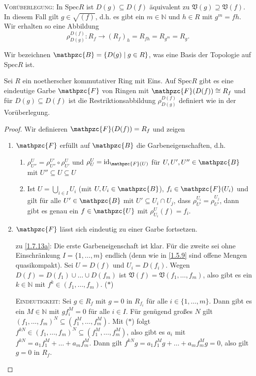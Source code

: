 \documentclass[a4paper,12pt]{scrbook}
\newtheorem{proof}{Beweis}
\def\V{\mathfrak{V}}
\newcommand{\Spec}{\mathrm{Spec}}
\newcommand{\id}{\mathrm{id}}
\newcommand{\ra}{\longrightarrow}
\newcommand{\set}[1]{\ensuremath{\mathbb{#1}}}
\newcommand{\N}{\set{N}}
\begin{document}
\textsc{Vorüberlegung}: In $\Spec R$ ist $D(g)\subseteq D(f)$ äquivalent zu $\V(g)\supseteq\V(f)$. In diesem Fall gilt
$g\in\sqrt{(f)}$, d.h. es gibt ein $m\in\N$ und $h\in R$ mit $g^m=fh$. Wir erhalten so eine Abbildung
\[ \rho_{D(g)}^{D(f)}\colon R_f\ra (R_f)_h=R_{fh}=R_{g^m}=R_g. \]

Wir bezeichnen $\mathpzc{B}=\{D(g)\mid g\in R\}$, was eine Basis der Topologie auf $\Spec R$ ist.

\begin{prop}\label{1.7.13}
  Sei $R$ ein noetherscher kommutativer Ring mit Eins.
  Auf $\Spec R$ gibt es eine eindeutige Garbe $\mathpzc{F}$ von Ringen mit $\mathpzc{F}(D(f))\cong R_f$ und für $D(g)\subseteq
  D(f)$ ist die Restriktionsabbildung $\rho_{D(g)}^{D(f)}$ definiert wie in der Vorüberlegung.
\end{prop}
\begin{proof}
  Wir definieren $\mathpzc{F}(D(f))=R_f$ und zeigen
  \begin{enumerate}
  \item{} $\mathpzc{F}$ erfüllt auf $\mathpzc{B}$ die Garbeneigenschaften, d.h.
    \begin{enumerate}[label=(\textsc{g}\arabic*)]
    \item\label{G1} $\rho_{U''}^U=\rho_{U''}^{U'}\circ\rho_{U'}^U$ und $\rho_U^U=\id_{\mathpzc{F}(U)}$ für
      $U,U',U''\in\mathpzc{B}$ mit $U''\subseteq U\subseteq U$
    \item\label{G2} Ist $U=\bigcup_{i\in I}U_i$ (mit $U,U_i\in\mathpzc{B}$), $f_i\in\mathpzc{F}(U_i)$ und gilt für alle
      $U'\in\mathpzc{B}$ mit $U'\subseteq U_i\cap U_j$, dass $\rho_{U'}^{U_i}=\rho_{U'}^{U_j}$, dann gibt es genau ein
      $f\in\mathpzc{U}$ mit $\rho_{U_i}^U(f)=f_i$.
    \end{enumerate}
  \item{} $\mathpzc{F}$ lässt sich eindeutig zu einer Garbe fortsetzen.
  \end{enumerate}
  \begin{enumerate}
  \item[zu] \ref{1.7.13a}: Die erste Garbeneigenschaft ist klar. Für die zweite sei ohne Einschränkung $I=\{1,\dotsc,m\}$ endlich
    (denn wie in \cref{1.5.9} sind offene Mengen quasikompakt). Sei $U=D(f)$ und $U_i=D(f_i)$. Wegen
    $D(f)=D(f_1)\cup\dotso\cup D(f_m)$ ist $\V(f)=\V(f_1,\dotsc,f_m)$, also gibt es ein $k\in\N$ mit
    $f^k\in(f_1,\dotsc,f_m)$. \hfill ($*$)

    \textsc{Eindeutigkeit}: Sei $g\in R_f$ mit $g=0$ in $R_{f_i}$ für alle $i\in\{1,\dotsc,m\}$. Dann gibt es ein $M\in\N$ mit
    $gf_i^M=0$ für alle $i\in I$. Für genügend großes $N$ gilt $(f_1,\dotsc,f_m)^N\subseteq(f_1^M,\dotsc,f_m^M)$. Mit ($*$)
    folgt $f^{kN}\in(f_1,\dotsc,f_m)^N\subseteq(f_1^M,\dotsc,f_m^M)$, also gibt es $a_i$ mit
    $f^{kN}=a_1f_1^M+\dotso+a_mf_m^M$. Dann gilt $f^{kN}g=a_1f_1^Mg+\dotso+a_mf_m^Mg=0$, also gilt $g=0$ in $R_f$.


\end{enumerate}
\end{proof}
\end{document}
